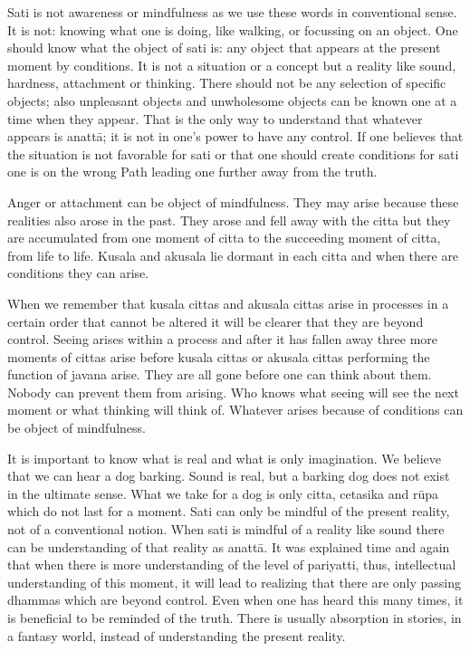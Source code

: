 {Sati is not awareness or mindfulness as we use these words in
conventional sense. It is not: knowing what one is doing, like walking,
or focussing on an object. One should know what the object of sati is:
any object that appears at the present moment by conditions. It is not a
situation or a concept but a reality like sound, hardness, attachment or
thinking. There should not be any selection of specific objects; also
unpleasant objects and unwholesome objects can be known one at a time
when they appear. That is the only way to understand that whatever
appears is anattā; it is not in one's power to have any control. If one
believes that the situation is not favorable for sati or that one should
create conditions for sati one is on the wrong Path leading one further
away from the truth. 

Anger or attachment can be object of mindfulness. They may
arise because these realities also arose in the past. They arose and
fell away with the citta but they are accumulated from one moment of
citta to the succeeding moment of citta, from life to life. Kusala and
akusala lie dormant in each citta and when there are conditions they can
arise.

When we remember that kusala cittas and akusala cittas arise
in processes in a certain order that cannot be altered it will be
clearer that they are beyond control. Seeing arises within a process and
after it has fallen away three more moments of cittas arise before
kusala cittas or akusala cittas performing the function of javana arise.
They are all gone before one can think about them. Nobody can prevent
them from arising. Who knows what seeing will see the next moment or
what thinking will think of. Whatever arises because of conditions can
be object of mindfulness. 

It is important to know what is real and what is only
imagination. We believe that we can hear a dog
barking. Sound is real, but
a barking dog does not exist in the ultimate sense. What we take for a
dog is only citta, cetasika and rūpa which do not last for a moment.
Sati can only be mindful of the present reality, not of a conventional
notion. When sati is mindful of a reality like sound there can be
understanding of that reality as anattā. It was explained time and again
that when there is more understanding of the level of pariyatti, thus,
intellectual understanding of this moment, it will lead to realizing
that there are only passing dhammas which are beyond control. Even when
one has heard this many times, it is beneficial to be reminded of the
truth. There is usually absorption in stories, in a fantasy world,
instead of understanding the present reality. 

}
